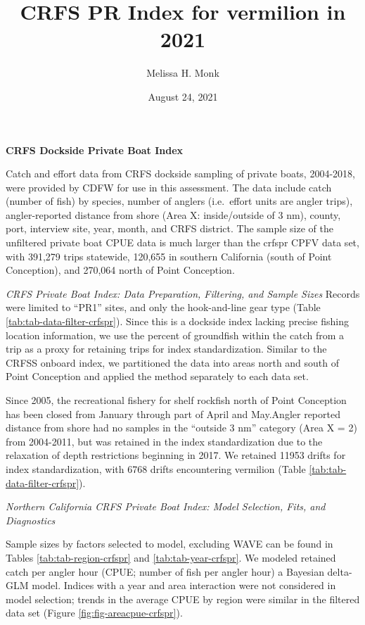 \documentclass[
]{article}
\title{CRFS PR Index for vermilion in 2021}
\author{Melissa H. Monk}
\date{August 24, 2021}
\begin{document}
\maketitle

{
\setcounter{tocdepth}{2}
\tableofcontents
}
\textbf{CRFS Dockside Private Boat Index}

Catch and effort data from CRFS dockside sampling of private boats, 2004-2018,
were provided by CDFW for use in this assessment. The data include catch (number
of fish) by species, number of anglers (i.e.~effort units are angler trips),
angler-reported distance from shore (Area X: inside/outside of 3 nm), county, port,
interview site, year, month, and CRFS district. The sample size of the
unfiltered private boat CPUE data is much larger than the crfspr CPFV data set,
with 391,279 trips statewide, 120,655 in southern California (south
of Point Conception), and 270,064 north of Point Conception.

\emph{CRFS Private Boat Index: Data Preparation, Filtering, and Sample Sizes}
Records were limited to ``PR1'' sites, and only the hook-and-line gear type
(Table \ref{tab:tab-data-filter-crfspr}).
Since this is a dockside index lacking precise fishing location information, we
use the percent of groundfish within the catch from a trip as a proxy for retaining
trips for index standardization. Similar to the CRFSS onboard index, we partitioned the
data into areas north and south of Point Conception and applied the method
separately to each data set.

Since 2005, the recreational fishery for shelf rockfish north of Point Conception
has been closed from January through part of April and May.Angler reported distance
from shore had no samples in the ``outside 3 nm'' category (Area X = 2)
from 2004-2011, but was retained in the index standardization due to the relaxation
of depth restrictions beginning in 2017. We retained 11953 drifts for
index standardization, with 6768 drifts encountering vermilion
(Table \ref{tab:tab-data-filter-crfspr}).

\emph{Northern California CRFS Private Boat Index: Model Selection, Fits, and Diagnostics}

Sample sizes by factors selected to model, excluding WAVE can be found in Tables
\ref{tab:tab-region-crfspr} and \ref{tab:tab-year-crfspr}.
We modeled retained catch per angler hour (CPUE; number of fish per angler hour)
a Bayesian delta-GLM model. Indices with a year and area interaction were not
considered in model selection; trends in the average CPUE by region were similar
in the filtered data set (Figure \ref{fig:fig-areacpue-crfspr}).
\end{document}
